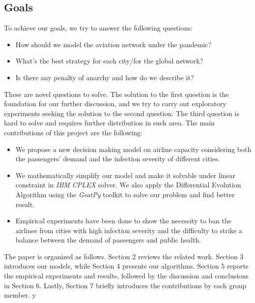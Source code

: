 \subsection{Goals}
To achieve our goals, we try to answer the following questions:
\begin{itemize}    
    \item How should we model the aviation network under the pandemic?
    \item What's the best strategy for each city/for the global network?
    \item Is there any penalty of anarchy and how do we describe it?
\end{itemize}


These are novel questions to solve. The solution to the first question is the foundation for our further discussion, and we try to carry out exploratory experiments seeking the solution to the second question. The third question is hard to solve and requires further distribution in such area. The main contributions of this project are the following:
\begin{itemize}
    \item We propose a new decision making model on airline capacity considering both the passengers' demand and the infection severity of different cities.
    \item We mathematically simplify our model and make it solvable under linear constraint in \emph{IBM CPLEX} solver. We also apply the Differential Evolution Algorithm using the \emph{GeatPy}\cite{geatpy} toolkit to solve our problem and find better result.
    
    \item Empirical experiments have been done to show the necessity to ban the airlines from cities with high infection severity and the difficulty to strike a balance between the demand of passengers and public health. 
\end{itemize}

The paper is organized as follows. Section 2 reviews the related work. Section 3 introduces our models, while Section 4 presents our algorithms. Section 5 reports the empirical experiments and results, followed by the discussion and conclusions in Section 6. Lastly, Section 7 briefly introduces the contributions by each group member. 
y

